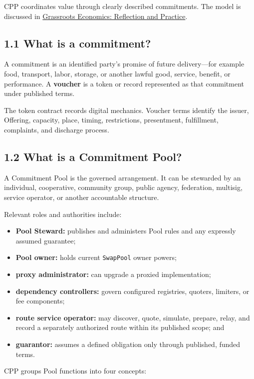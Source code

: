 \documentclass[11pt]{article}
\begin{document}
CPP coordinates value through clearly described commitments. The model is discussed in \href{https://willruddick.substack.com/p/grassroots-economics-the-book-is}{Grassroots Economics: Reflection and Practice}.

\subsection*{1.1 What is a commitment?}

A commitment is an identified party's promise of future delivery---for example food, transport, labor, storage, or another lawful good, service, benefit, or performance. A \textbf{voucher} is a token or record represented as that commitment under published terms.

The token contract records digital mechanics. Voucher terms identify the issuer, Offering, capacity, place, timing, restrictions, presentment, fulfillment, complaints, and discharge process.

\subsection*{1.2 What is a Commitment Pool?}

A Commitment Pool is the governed arrangement. It can be stewarded by an individual, cooperative, community group, public agency, federation, multisig, service operator, or another accountable structure.

Relevant roles and authorities include:

\begin{itemize}[leftmargin=*]
\item \textbf{Pool Steward:} publishes and administers Pool rules and any expressly assumed guarantee;
\item \textbf{Pool owner:} holds current \texttt{SwapPool} owner powers;
\item \textbf{proxy administrator:} can upgrade a proxied implementation;
\item \textbf{dependency controllers:} govern configured registries, quoters, limiters, or fee components;
\item \textbf{route service operator:} may discover, quote, simulate, prepare, relay, and record a separately authorized route within its published scope; and
\item \textbf{guarantor:} assumes a defined obligation only through published, funded terms.
\end{itemize}
CPP groups Pool functions into four concepts:
\end{document}
